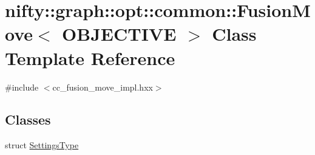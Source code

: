 \hypertarget{classnifty_1_1graph_1_1opt_1_1common_1_1FusionMove}{}\section{nifty\+:\+:graph\+:\+:opt\+:\+:common\+:\+:Fusion\+Move$<$ O\+B\+J\+E\+C\+T\+I\+VE $>$ Class Template Reference}
\label{classnifty_1_1graph_1_1opt_1_1common_1_1FusionMove}


{\ttfamily \#include $<$cc\+\_\+fusion\+\_\+move\+\_\+impl.\+hxx$>$}

\subsection*{Classes}
\begin{DoxyCompactItemize}
\item 
struct \hyperlink{structnifty_1_1graph_1_1opt_1_1common_1_1FusionMove_1_1SettingsType}{Settings\+Type}
\end{DoxyCompactItemize}
